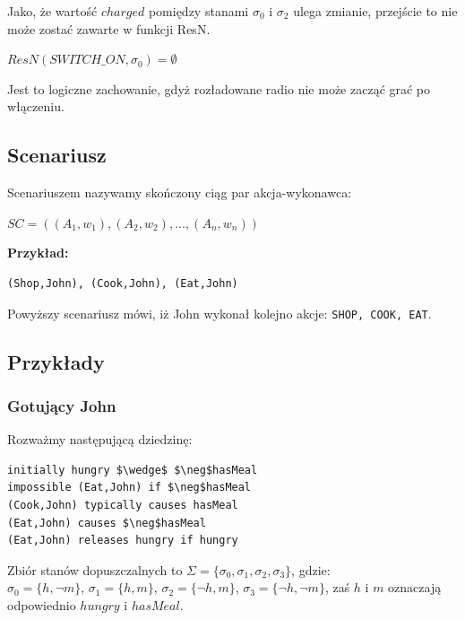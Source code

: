 \documentclass{article}
\begin{document}
Jako, że wartość $charged$ pomiędzy stanami $\sigma_{0}$ i $\sigma_{2}$ ulega zmianie, przejście to nie może zostać zawarte w funkcji ResN.
\begin{center}
$ResN(SWITCH\_ON, \sigma_{0}) = \emptyset$
\end{center}
Jest to logiczne zachowanie, gdyż rozładowane radio nie może zacząć grać po włączeniu.




\subsection{Scenariusz}
Scenariuszem nazywamy skończony ciąg par akcja-wykonawca:
\begin{center}
$SC=((A_1,w_1),(A_2,w_2),...,(A_n,w_n))$
\end{center}
\textbf{Przykład:}
\begin{lstlisting}[mathescape=true]
(Shop,John), (Cook,John), (Eat,John)
\end{lstlisting}
Powyższy scenariusz mówi, iż John wykonał kolejno akcje: \texttt{SHOP, COOK, EAT}.

\subsection{Przykłady}
\subsubsection{Gotujący John}

Rozważmy następującą dziedzinę:
\bigskip
{}
\begin{lstlisting}[mathescape=true]
initially hungry $\wedge$ $\neg$hasMeal 
impossible (Eat,John) if $\neg$hasMeal 
(Cook,John) typically causes hasMeal
(Eat,John) causes $\neg$hasMeal 
(Eat,John) releases hungry if hungry
\end{lstlisting}
Zbiór stanów dopuszczalnych to $\Sigma=\{\sigma_{0},\sigma_{1},\sigma_{2},\sigma_{3}\}$, gdzie:\\
$\sigma_{0}=\{h,\neg m\}$, $\sigma_{1}=\{h, m\}$, $\sigma_{2}=\{\neg h, m\}$, $\sigma_{3}=\{\neg h,\neg m\}$, zaś $h$ i $m$ oznaczają odpowiednio $hungry$ i $hasMeal$.\\
\end{document}
